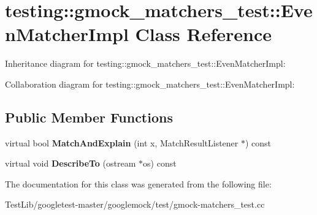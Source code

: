\hypertarget{classtesting_1_1gmock__matchers__test_1_1EvenMatcherImpl}{}\section{testing\+:\+:gmock\+\_\+matchers\+\_\+test\+:\+:Even\+Matcher\+Impl Class Reference}
\label{classtesting_1_1gmock__matchers__test_1_1EvenMatcherImpl}


Inheritance diagram for testing\+:\+:gmock\+\_\+matchers\+\_\+test\+:\+:Even\+Matcher\+Impl\+:


Collaboration diagram for testing\+:\+:gmock\+\_\+matchers\+\_\+test\+:\+:Even\+Matcher\+Impl\+:
\subsection*{Public Member Functions}
\begin{DoxyCompactItemize}
\item 
\mbox{\label{classtesting_1_1gmock__matchers__test_1_1EvenMatcherImpl_a0ca990403daf3856cda897e4b1a02ae4}} 
virtual bool {\bfseries Match\+And\+Explain} (int x, Match\+Result\+Listener $\ast$) const
\item 
\mbox{\label{classtesting_1_1gmock__matchers__test_1_1EvenMatcherImpl_ae72d37964b4004dfa3a04d7b529ad2f9}} 
virtual void {\bfseries Describe\+To} (ostream $\ast$os) const
\end{DoxyCompactItemize}


The documentation for this class was generated from the following file\+:\begin{DoxyCompactItemize}
\item 
Test\+Lib/googletest-\/master/googlemock/test/gmock-\/matchers\+\_\+test.\+cc\end{DoxyCompactItemize}
